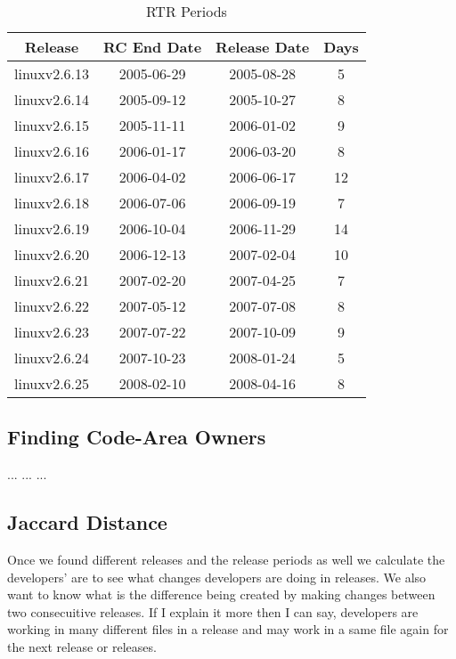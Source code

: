 \documentclass{acm_proc_article-sp}
\begin{document}
\begin{table}[ht]
\caption{RTR Periods}  %
\centering 						%
\begin{tabular}{c c c c}				%
\hline\hline						%
Release 			& RC End Date	& Release Date	& Days \\ [0.5ex]
\hline 							%
linuxv2.6.13		& 2005-06-29	& 2005-08-28	& 5 \\
linuxv2.6.14		& 2005-09-12	& 2005-10-27	& 8 \\
linuxv2.6.15		& 2005-11-11	& 2006-01-02	& 9 \\
linuxv2.6.16		& 2006-01-17	& 2006-03-20	& 8 \\
linuxv2.6.17		& 2006-04-02	& 2006-06-17	& 12 \\
linuxv2.6.18		& 2006-07-06	& 2006-09-19	& 7 \\
linuxv2.6.19		& 2006-10-04	& 2006-11-29	& 14 \\
linuxv2.6.20  		& 2006-12-13	& 2007-02-04	& 10 \\
linuxv2.6.21		& 2007-02-20	& 2007-04-25	& 7 \\
linuxv2.6.22		& 2007-05-12	& 2007-07-08	& 8 \\
linuxv2.6.23		& 2007-07-22	& 2007-10-09	& 9 \\
linuxv2.6.24		& 2007-10-23	& 2008-01-24	& 5 \\
linuxv2.6.25		& 2008-02-10	& 2008-04-16	& 8 \\
[1ex]							%
\hline 							%
\end{tabular}
\label{table:nonlin} 				%
\end{table}



\subsection{Finding Code-Area Owners}
... ... ...

\subsection{Jaccard Distance}
Once we found different releases and the release periods as well we calculate the developers' are to see what changes developers are doing in releases. We also want to know what is the difference being created by making changes between two consecuitive releases. If I explain it more then I can say, developers are working in many different files in a release and may work in a same file again for the next release or releases. 
\end{document}
